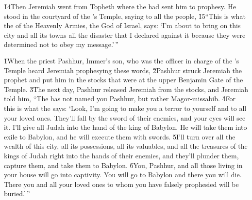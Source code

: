 \v{14}Then Jeremiah went from Topheth where the  had sent him to prophesy. He stood in the courtyard of the 's Temple, saying to all the people, \v{15}``This is what the  of the Heavenly Armies, the God of Israel, says: `I'm about to bring on this city and all its towns all the disaster that I declared against it because they were determined not to obey my message.'\,''

\v{1}When the priest Pashhur, Immer's son, who was the officer in charge of the 's Temple heard Jeremiah prophesying these words, \v{2}Pashhur struck Jeremiah the prophet and put him in the stocks that were at the upper Benjamin Gate of the Temple. \v{3}The next day, Pashhur released Jeremiah from the stocks, and Jeremiah told him, ``The  has not named you Pashhur, but rather Magor-missabib. \v{4}For this is what the  says: `Look, I'm going to make you a terror to yourself and to all your loved ones. They'll fall by the sword of their enemies, and your eyes will see it. I'll give all Judah into the hand of the king of Babylon. He will take them into exile to Babylon, and he will execute them with swords. \v{5}I'll turn over all the wealth of this city, all its possessions, all its valuables, and all the treasures of the kings of Judah right into the hands of their enemies, and they'll plunder them, capture them, and take them to Babylon. \v{6}You, Pashhur, and all those living in your house will go into captivity. You will go to Babylon and there you will die. There you and all your loved ones to whom you have falsely prophesied will be buried.'\,''

